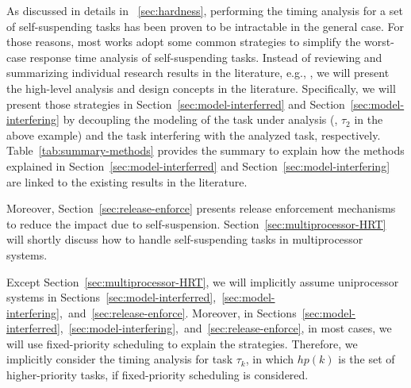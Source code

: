 As discussed in details in \mysectionref{}~\ref{sec:hardness}, performing the timing analysis for a set of self-suspending tasks has been proven to be intractable in the general case. For those reasons, most works adopt some common strategies to simplify the worst-case response time analysis of self-suspending tasks. Instead of reviewing and summarizing individual research results in the literature, e.g., \cite{Raj:suspension1991,RTCSA-KimCPKH95,MingLiRTCSA1994,PH:rtss98,ECRTS-AudsleyB04,RTAS-AudsleyB04,RTCSA-BletsasA05,LR:rtas10,RTSS-KimANR13,LiuChen:rtss2014,huangpass:dac2015,Huang:multiseg,WC16-suspend-DATE}, we will present the high-level analysis and design concepts in the literature. Specifically, we will present those strategies in Section~\ref{sec:model-interferred} and Section~\ref{sec:model-interfering} by decoupling the modeling of the task under analysis (\ie, $\tau_2$ in the above example) and the task interfering with the analyzed task, respectively. Table~\ref{tab:summary-methods} provides the summary to explain how the methods explained in Section~\ref{sec:model-interferred} and Section~\ref{sec:model-interfering} are linked to the existing results in the literature. 

Moreover, Section~\ref{sec:release-enforce} presents  release enforcement mechanisms to reduce the impact due to self-suspension. 
Section~\ref{sec:multiprocessor-HRT} will shortly discuss how to handle self-suspending tasks in multiprocessor systems.

Except Section~\ref{sec:multiprocessor-HRT}, we will implicitly assume uniprocessor systems in Sections~\ref{sec:model-interferred},~\ref{sec:model-interfering},~and~\ref{sec:release-enforce}. Moreover, in Sections~\ref{sec:model-interferred},~\ref{sec:model-interfering},~and~\ref{sec:release-enforce}, in most cases, we will use fixed-priority scheduling to explain the strategies. Therefore, we implicitly consider the timing analysis for task $\tau_k$, in which $hp(k)$ is the set of higher-priority tasks, if fixed-priority scheduling is considered. 

